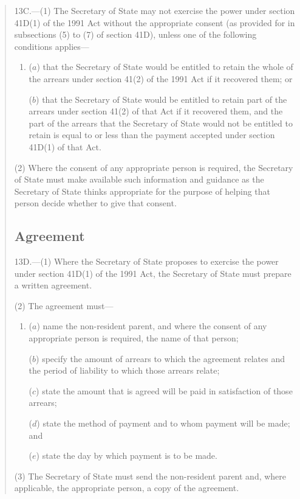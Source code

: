 \documentclass[12pt,a4paper]{article}
\begin{document}
\begin{quotation}
13C.---(1)  The Secretary of State may not exercise the power under section 41D(1) of the 1991 Act without the appropriate consent (as provided for in subsections (5) to (7) of section 41D), unless one of the following conditions applies—
\begin{enumerate}\item[]
($a$) that the Secretary of State would be entitled to retain the whole of the arrears under section 41(2) of the 1991 Act if it recovered them; or

($b$) that the Secretary of State would be entitled to retain part of the arrears under section 41(2) of that Act if it recovered them, and the part of the arrears that the Secretary of State would not be entitled to retain is equal to or less than the payment accepted under section 41D(1) of that Act.
\end{enumerate}

(2) Where the consent of any appropriate person is required, the Secretary of State must make available such information and guidance as the Secretary of State thinks appropriate for the purpose of helping that person decide whether to give that consent.

\subsection*{Agreement}

13D.---(1)  Where the Secretary of State proposes to exercise the power under section 41D(1) of the 1991 Act, the Secretary of State must prepare a written agreement.

(2) The agreement must—
\begin{enumerate}\item[]
($a$) name the non-resident parent, and where the consent of any appropriate person is required, the name of that person;

($b$) specify the amount of arrears to which the agreement relates and the period of liability to which those arrears relate;

($c$) state the amount that is agreed will be paid in satisfaction of those arrears;

($d$) state the method of payment and to whom payment will be made; and

($e$) state the day by which payment is to be made.
\end{enumerate}

(3) The Secretary of State must send the non-resident parent and, where applicable, the appropriate person, a copy of the agreement.


\end{quotation}
\end{document}
